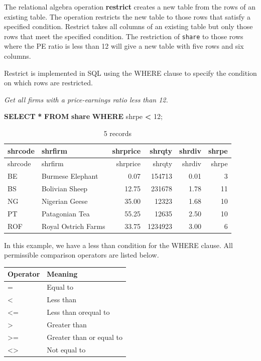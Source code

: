 \documentclass[
]{article}
\newenvironment{Shaded}{\begin{snugshade}}{\end{snugshade}}
\newcommand{\DecValTok}[1]{\textcolor[rgb]{0.00,0.00,0.81}{#1}}
\newcommand{\KeywordTok}[1]{\textcolor[rgb]{0.13,0.29,0.53}{\textbf{#1}}}
\newcommand{\NormalTok}[1]{#1}
\newcommand{\OperatorTok}[1]{\textcolor[rgb]{0.81,0.36,0.00}{\textbf{#1}}}
\begin{document}
The relational algebra operation \textbf{restrict} creates a new table
from the rows of an existing table. The operation restricts the new
table to those rows that satisfy a specified condition. Restrict takes
all columns of an existing table but only those rows that meet the
specified condition. The restriction of \texttt{share} to those rows
where the PE ratio is less than 12 will give a new table with five rows
and six columns.

Restrict is implemented in SQL using the WHERE clause to specify the
condition on which rows are restricted.

\emph{Get all firms with a price-earnings ratio less than 12.}

\begin{Shaded}
\begin{Highlighting}[]
\KeywordTok{SELECT} \OperatorTok{*} \KeywordTok{FROM} \KeywordTok{share} \KeywordTok{WHERE}\NormalTok{ shrpe }\OperatorTok{\textless{}} \DecValTok{12}\NormalTok{;}
\end{Highlighting}
\end{Shaded}

\begin{longtable}[]{@{}llrrrr@{}}
\caption{5 records}\tabularnewline
\toprule()
shrcode & shrfirm & shrprice & shrqty & shrdiv & shrpe \\
\midrule()
\endfirsthead
\toprule()
shrcode & shrfirm & shrprice & shrqty & shrdiv & shrpe \\
\midrule()
\endhead
BE & Burmese Elephant & 0.07 & 154713 & 0.01 & 3 \\
BS & Bolivian Sheep & 12.75 & 231678 & 1.78 & 11 \\
NG & Nigerian Geese & 35.00 & 12323 & 1.68 & 10 \\
PT & Patagonian Tea & 55.25 & 12635 & 2.50 & 10 \\
ROF & Royal Ostrich Farms & 33.75 & 1234923 & 3.00 & 6 \\
\bottomrule()
\end{longtable}

In this example, we have a less than condition for the WHERE clause. All
permissible comparison operators are listed below.

\begin{longtable}[]{@{}ll@{}}
\toprule()
Operator & Meaning \\
\midrule()
\endhead
= & Equal to \\
\textless{} & Less than \\
\textless= & Less than orequal to \\
\textgreater{} & Greater than \\
\textgreater= & Greater than or equal to \\
\textless\textgreater{} & Not equal to \\
\bottomrule()
\end{longtable}
\end{document}
